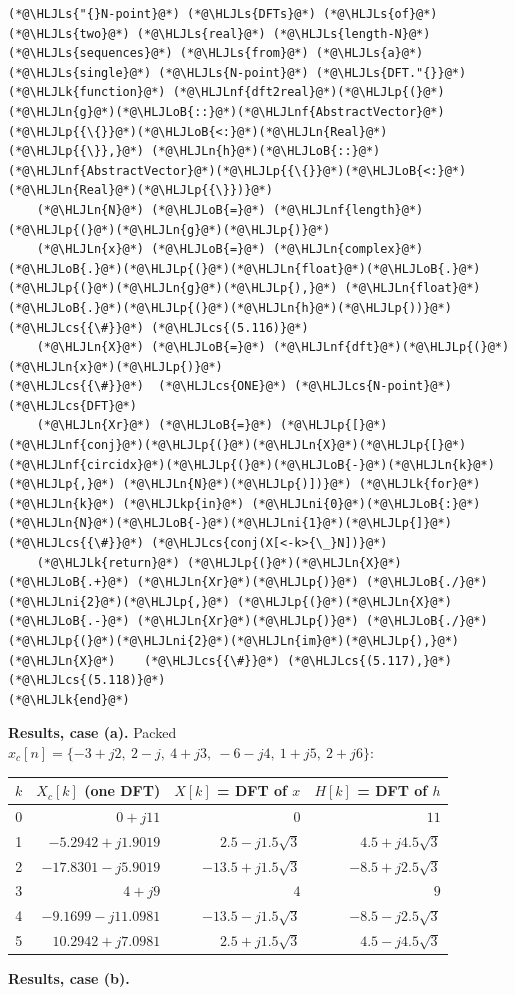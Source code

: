\documentclass[12pt,a4paper]{article}
\newcommand{\HLJLk}[1]{\textcolor[RGB]{148,91,176}{\textbf{#1}}}
\newcommand{\HLJLkp}[1]{\textcolor[RGB]{148,91,176}{\textbf{#1}}}
\newcommand{\HLJLn}[1]{#1}
\newcommand{\HLJLnf}[1]{\textcolor[RGB]{66,102,213}{#1}}
\newcommand{\HLJLs}[1]{\textcolor[RGB]{201,61,57}{#1}}
\newcommand{\HLJLni}[1]{\textcolor[RGB]{59,151,46}{#1}}
\newcommand{\HLJLoB}[1]{\textcolor[RGB]{102,102,102}{\textbf{#1}}}
\newcommand{\HLJLp}[1]{#1}
\newcommand{\HLJLcs}[1]{\textcolor[RGB]{153,153,119}{\textit{#1}}}
\begin{document}
\begin{lstlisting}
(*@\HLJLs{"{}N-point}@*) (*@\HLJLs{DFTs}@*) (*@\HLJLs{of}@*) (*@\HLJLs{two}@*) (*@\HLJLs{real}@*) (*@\HLJLs{length-N}@*) (*@\HLJLs{sequences}@*) (*@\HLJLs{from}@*) (*@\HLJLs{a}@*) (*@\HLJLs{single}@*) (*@\HLJLs{N-point}@*) (*@\HLJLs{DFT."{}}@*)
(*@\HLJLk{function}@*) (*@\HLJLnf{dft2real}@*)(*@\HLJLp{(}@*)(*@\HLJLn{g}@*)(*@\HLJLoB{::}@*)(*@\HLJLnf{AbstractVector}@*)(*@\HLJLp{{\{}}@*)(*@\HLJLoB{<:}@*)(*@\HLJLn{Real}@*)(*@\HLJLp{{\}},}@*) (*@\HLJLn{h}@*)(*@\HLJLoB{::}@*)(*@\HLJLnf{AbstractVector}@*)(*@\HLJLp{{\{}}@*)(*@\HLJLoB{<:}@*)(*@\HLJLn{Real}@*)(*@\HLJLp{{\}})}@*)
    (*@\HLJLn{N}@*) (*@\HLJLoB{=}@*) (*@\HLJLnf{length}@*)(*@\HLJLp{(}@*)(*@\HLJLn{g}@*)(*@\HLJLp{)}@*)
    (*@\HLJLn{x}@*) (*@\HLJLoB{=}@*) (*@\HLJLn{complex}@*)(*@\HLJLoB{.}@*)(*@\HLJLp{(}@*)(*@\HLJLn{float}@*)(*@\HLJLoB{.}@*)(*@\HLJLp{(}@*)(*@\HLJLn{g}@*)(*@\HLJLp{),}@*) (*@\HLJLn{float}@*)(*@\HLJLoB{.}@*)(*@\HLJLp{(}@*)(*@\HLJLn{h}@*)(*@\HLJLp{))}@*)              (*@\HLJLcs{{\#}}@*) (*@\HLJLcs{(5.116)}@*)
    (*@\HLJLn{X}@*) (*@\HLJLoB{=}@*) (*@\HLJLnf{dft}@*)(*@\HLJLp{(}@*)(*@\HLJLn{x}@*)(*@\HLJLp{)}@*)                                      (*@\HLJLcs{{\#}}@*)  (*@\HLJLcs{ONE}@*) (*@\HLJLcs{N-point}@*) (*@\HLJLcs{DFT}@*)
    (*@\HLJLn{Xr}@*) (*@\HLJLoB{=}@*) (*@\HLJLp{[}@*)(*@\HLJLnf{conj}@*)(*@\HLJLp{(}@*)(*@\HLJLn{X}@*)(*@\HLJLp{[}@*)(*@\HLJLnf{circidx}@*)(*@\HLJLp{(}@*)(*@\HLJLoB{-}@*)(*@\HLJLn{k}@*)(*@\HLJLp{,}@*) (*@\HLJLn{N}@*)(*@\HLJLp{)])}@*) (*@\HLJLk{for}@*) (*@\HLJLn{k}@*) (*@\HLJLkp{in}@*) (*@\HLJLni{0}@*)(*@\HLJLoB{:}@*)(*@\HLJLn{N}@*)(*@\HLJLoB{-}@*)(*@\HLJLni{1}@*)(*@\HLJLp{]}@*)   (*@\HLJLcs{{\#}}@*) (*@\HLJLcs{conj(X[<-k>{\_}N])}@*)
    (*@\HLJLk{return}@*) (*@\HLJLp{(}@*)(*@\HLJLn{X}@*) (*@\HLJLoB{.+}@*) (*@\HLJLn{Xr}@*)(*@\HLJLp{)}@*) (*@\HLJLoB{./}@*) (*@\HLJLni{2}@*)(*@\HLJLp{,}@*) (*@\HLJLp{(}@*)(*@\HLJLn{X}@*) (*@\HLJLoB{.-}@*) (*@\HLJLn{Xr}@*)(*@\HLJLp{)}@*) (*@\HLJLoB{./}@*) (*@\HLJLp{(}@*)(*@\HLJLni{2}@*)(*@\HLJLn{im}@*)(*@\HLJLp{),}@*) (*@\HLJLn{X}@*)    (*@\HLJLcs{{\#}}@*) (*@\HLJLcs{(5.117),}@*) (*@\HLJLcs{(5.118)}@*)
(*@\HLJLk{end}@*)
\end{lstlisting}

\textbf{Results, case (a).} Packed $x_c[n] = \{-3+j2,\ 2-j,\ 4+j3,\ -6-j4,\ 1+j5,\ 2+j6\}$:

\begin{tabular}
{r | r | r | r}
$k$ & $X_c[k]$ (one DFT) & $X[k]$ = DFT of $x$ & $H[k]$ = DFT of $h$ \\
\hline
0 & $0 + j11$ & $0$ & $11$ \\
1 & $-5.2942 + j1.9019$ & $2.5 - j1.5\sqrt3$ & $4.5 + j4.5\sqrt3$ \\
2 & $-17.8301 - j5.9019$ & $-13.5 + j1.5\sqrt3$ & $-8.5 + j2.5\sqrt3$ \\
3 & $4 + j9$ & $4$ & $9$ \\
4 & $-9.1699 - j11.0981$ & $-13.5 - j1.5\sqrt3$ & $-8.5 - j2.5\sqrt3$ \\
5 & $10.2942 + j7.0981$ & $2.5 + j1.5\sqrt3$ & $4.5 - j4.5\sqrt3$ \\
\end{tabular}
\textbf{Results, case (b).}
\end{document}

